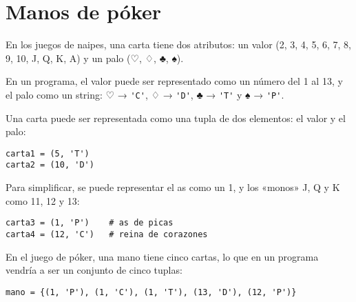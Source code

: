 \section{Manos de póker}

En los juegos de naipes, una carta tiene dos atributos:
un valor (2, 3, 4, 5, 6, 7, 8, 9, 10, J, Q, K, A)
y un palo (♡, ♢, ♣, ♠).

En un programa,
el valor puede ser representado como un número del 1 al 13,
y el palo como un string:
♡ → \lstinline!'C'!,
♢ → \lstinline!'D'!,
♣ → \lstinline!'T'! y
♠ → \lstinline!'P'!.

Una carta puede ser representada como una tupla de dos elementos: el
valor y el palo:

\begin{lstlisting}
carta1 = (5, 'T')
carta2 = (10, 'D')
\end{lstlisting}

Para simplificar, se puede representar el as como un 1, y los «monos» J,
Q y K como 11, 12 y 13:

\begin{lstlisting}
carta3 = (1, 'P')    # as de picas
carta4 = (12, 'C')   # reina de corazones
\end{lstlisting}

En el juego de póker, una mano tiene cinco cartas, lo que en un programa
vendría a ser un conjunto de cinco tuplas:

\begin{lstlisting}
mano = {(1, 'P'), (1, 'C'), (1, 'T'), (13, 'D'), (12, 'P')}
\end{lstlisting}


